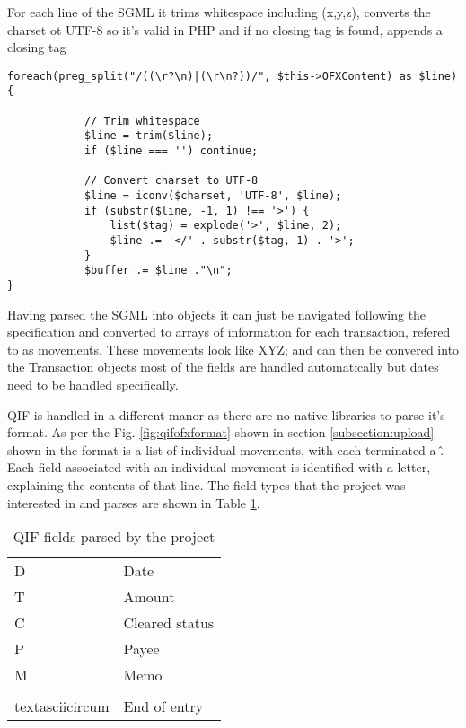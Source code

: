 

For each line of the SGML it trims whitespace including (x,y,z), converts the charset ot UTF-8 so it's valid in PHP and if no closing tag is found, appends a closing tag

\lstset{style=phpcolor}
\begin{lstlisting}
foreach(preg_split("/((\r?\n)|(\r\n?))/", $this->OFXContent) as $line){
        		
        	// Trim whitespace
        	$line = trim($line);
        	if ($line === '') continue;
        
        	// Convert charset to UTF-8
        	$line = iconv($charset, 'UTF-8', $line);
        	if (substr($line, -1, 1) !== '>') {
        		list($tag) = explode('>', $line, 2);
        		$line .= '</' . substr($tag, 1) . '>';
        	}
        	$buffer .= $line ."\n";
}
\end{lstlisting}

Having parsed the SGML into objects it can just be navigated following the specification and converted to arrays of information for each transaction, refered to as movements. These movements look like XYZ; and can then be convered into the Transaction objects most of the fields are handled automatically but dates need to be handled specifically.

QIF is handled in a different manor as there are no native libraries to parse it's format. As per the Fig. \ref{fig:qifofxformat} shown in section \ref{subsection:upload} shown in  the format is a list of individual movements, with each terminated a \^. Each field associated with an individual movement is identified with a letter, explaining the contents of that line.
% 
The field types that the project was interested in and parses are shown in Table \ref{table:qiffields}.

\begin{table}[h]
\begin{tabular}{ll}
D                  & Date           \\
T                  & Amount         \\
C                  & Cleared status \\
P                  & Payee          \\
M                  & Memo           \\
\\textasciicircum  & End of entry  
\end{tabular}
\caption{QIF fields parsed by the project}
\label{table:qiffields}
\end{table}

